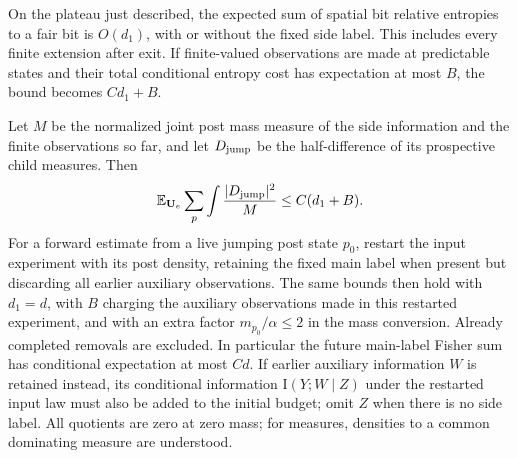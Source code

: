 \begin{lemma}\label{lemma:07-local-budget}
On the plateau just described, the expected sum of spatial bit relative
entropies to a fair bit is $O(d_1)$, with or without the fixed side label.
This includes every finite extension after exit. If finite-valued
observations are made at predictable states and their total conditional
entropy cost has expectation at most $B$, the bound becomes $C d_1+B$.

Let $M$ be the normalized joint post mass measure of the side information and
the finite observations so far, and let $D_{\rm jump}$ be the half-difference
of its prospective child measures. Then
\begin{equation}\label{eq:07-local-fisher}
 \mathbb E_{\mathbf U_e}\sum_p
       \int\frac{|D_{\rm jump}|^2}{M}\le C(d_1+B).
\end{equation}
For a forward estimate from a live jumping post state $p_0$, restart the
input experiment with its post density, retaining the fixed main label
when present but discarding all earlier auxiliary observations. The same
bounds then hold with $d_1=d$, with $B$ charging the auxiliary observations
made in this restarted experiment, and with an extra factor
$m_{p_0}/\alpha\le2$ in the mass conversion. Already completed removals
are excluded. In particular the future main-label Fisher sum has
conditional expectation at most $Cd$. If earlier auxiliary information
$W$ is retained instead, its conditional information
$\mathrm I(Y;W\mid Z)$ under the restarted input law must also be added
to the initial budget; omit $Z$ when there is no side label.
All quotients are zero at zero mass; for measures, densities to a common
dominating measure are understood.
\end{lemma}


